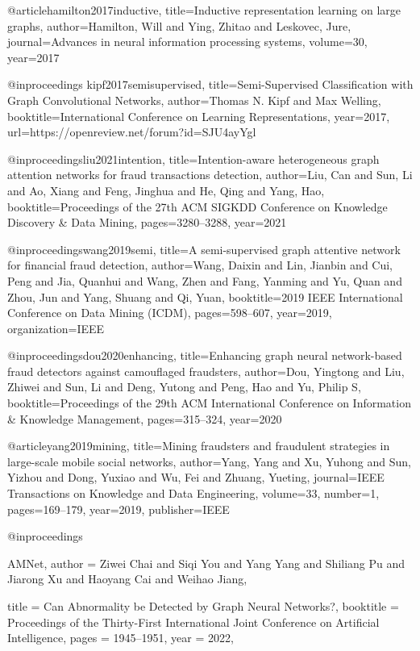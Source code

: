@article{hamilton2017inductive,
  title={Inductive representation learning on large graphs},
  author={Hamilton, Will and Ying, Zhitao and Leskovec, Jure},
  journal={Advances in neural information processing systems},
  volume={30},
  year={2017}
}

@inproceedings{
kipf2017semisupervised,
title={Semi-Supervised Classification with Graph Convolutional Networks},
author={Thomas N. Kipf and Max Welling},
booktitle={International Conference on Learning Representations},
year={2017},
url={https://openreview.net/forum?id=SJU4ayYgl}
}

@inproceedings{liu2021intention,
  title={Intention-aware heterogeneous graph attention networks for fraud transactions detection},
  author={Liu, Can and Sun, Li and Ao, Xiang and Feng, Jinghua and He, Qing and Yang, Hao},
  booktitle={Proceedings of the 27th ACM SIGKDD Conference on Knowledge Discovery \& Data Mining},
  pages={3280--3288},
  year={2021}
}

@inproceedings{wang2019semi,
  title={A semi-supervised graph attentive network for financial fraud detection},
  author={Wang, Daixin and Lin, Jianbin and Cui, Peng and Jia, Quanhui and Wang, Zhen and Fang, Yanming and Yu, Quan and Zhou, Jun and Yang, Shuang and Qi, Yuan},
  booktitle={2019 IEEE International Conference on Data Mining (ICDM)},
  pages={598--607},
  year={2019},
  organization={IEEE}
}

@inproceedings{dou2020enhancing,
  title={Enhancing graph neural network-based fraud detectors against camouflaged fraudsters},
  author={Dou, Yingtong and Liu, Zhiwei and Sun, Li and Deng, Yutong and Peng, Hao and Yu, Philip S},
  booktitle={Proceedings of the 29th ACM International Conference on Information \& Knowledge Management},
  pages={315--324},
  year={2020}
}

@article{yang2019mining,
  title={Mining fraudsters and fraudulent strategies in large-scale mobile social networks},
  author={Yang, Yang and Xu, Yuhong and Sun, Yizhou and Dong, Yuxiao and Wu, Fei and Zhuang, Yueting},
  journal={IEEE Transactions on Knowledge and Data Engineering},
  volume={33},
  number={1},
  pages={169--179},
  year={2019},
  publisher={IEEE}
}

@inproceedings{AMNet,
  author    = {Ziwei Chai and
               Siqi You and
               Yang Yang and
               Shiliang Pu and
               Jiarong Xu and
               Haoyang Cai and
               Weihao Jiang},

  title     = {Can Abnormality be Detected by Graph Neural Networks?},
  booktitle = {Proceedings of the Thirty-First International Joint Conference on
               Artificial Intelligence},
  pages     = {1945--1951},
  year      = {2022},

}


